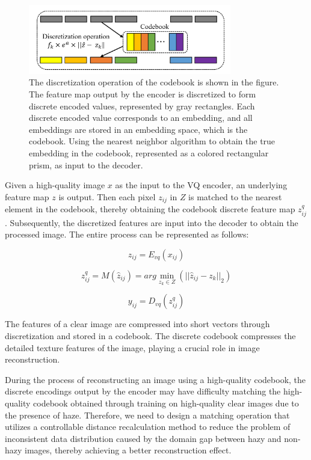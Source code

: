 \documentclass[journal]{IEEEtran}
\begin{document}
\begin{figure}[!t]
	\centering
	\includegraphics[width=3.49in]{discretization_operation}
	\caption{The discretization operation of the codebook is shown in the figure. The feature map output by the encoder is discretized to form discrete encoded values, represented by gray rectangles. Each discrete encoded value corresponds to an embedding, and all embeddings are stored in an embedding space, which is the codebook. Using the nearest neighbor algorithm to obtain the true embedding in the codebook, represented as a colored rectangular prism, as input to the decoder.}
	\label{fig2}
\end{figure}

Given a high-quality image $x$ as the input to the VQ encoder, an underlying feature map $z$ is output. Then each pixel $z_{ij}$ in $Z$ is matched to the nearest element in the codebook, thereby obtaining the codebook discrete feature map $z^{q}_{ij}$. Subsequently, the discretized features are input into the decoder to obtain the processed image. The entire process can be represented as follows:

\begin{equation}
	\label{vq_equation_1}
	z_{ij} = E_{vq}(x_{ij})
\end{equation}

\begin{equation}
	\label{vq_equation_2}
	z_{ij}^{q} = M(\widehat{z}_{ij}) = arg \min_{z_{k} \in Z} (|| \widehat{z}_{ij} - z_{k} ||_{2})
\end{equation}

\begin{equation}
	\label{vq_equation_3}
	y_{ij} = D_{vq}(z_{ij}^{q})
\end{equation}

The features of a clear image are compressed into short vectors through discretization and stored in a codebook. The discrete codebook compresses the detailed texture features of the image, playing a crucial role in image reconstruction.

During the process of reconstructing an image using a high-quality codebook, the discrete encodings output by the encoder may have difficulty matching the high-quality codebook obtained through training on high-quality clear images due to the presence of haze. Therefore, we need to design a matching operation that utilizes a controllable distance recalculation method to reduce the problem of inconsistent data distribution caused by the domain gap between hazy and non-hazy images, thereby achieving a better reconstruction effect.
\end{document}
